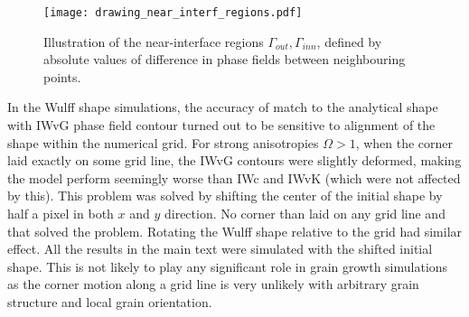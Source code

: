\begin{figure}[]
	\centering
	\texttt{[image: drawing\_near\_interf\_regions.pdf]}
	\caption[PF model implementation - the near-interface regions $\Gamma_{out},\Gamma_{inn}$]{Illustration of the near-interface regions $\Gamma_{out},\Gamma_{inn}$, defined by absolute values of difference in phase fields between neighbouring points.}
	\label{fig_sketch_near_interf_regions}
\end{figure}

In the Wulff shape simulations, the accuracy of match to the analytical shape with IWvG phase field contour turned out to be sensitive to alignment of the shape within the numerical grid. For strong anisotropies $\Omega>1$, when the corner laid exactly on some grid line, the IWvG contours were slightly deformed, making the model perform seemingly worse than IWc and IWvK (which were not affected by this). This problem was solved by shifting the center of the initial shape by half a pixel in both $x$ and $y$ direction. No corner than laid on any grid line and that solved the problem. Rotating the Wulff shape relative to the grid had similar effect. All the results in the main text were simulated with the shifted initial shape. This is not likely to play any significant role in grain growth simulations as the corner motion along a grid line is very unlikely with arbitrary grain structure and local grain orientation.

